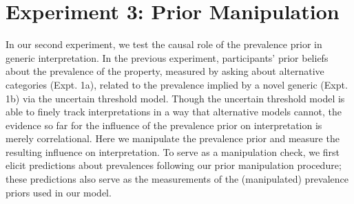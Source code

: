 \documentclass[floatsintext,doc]{apa6}
\begin{document}






\hypertarget{experiment-3-prior-manipulation}{%
\section{Experiment 3: Prior Manipulation}\label{experiment-3-prior-manipulation}}

In our second experiment, we test the causal role of the prevalence prior in generic interpretation.
In the previous experiment, participants' prior beliefs about the prevalence of the property, measured by asking about alternative categories (Expt. 1a), related to the prevalence implied by a novel generic (Expt. 1b) via the uncertain threshold model.
Though the uncertain threshold model is able to finely track interpretations in a way that alternative models cannot, the evidence so far for the influence of the prevalence prior on interpretation is merely correlational.
Here we manipulate the prevalence prior and measure the resulting influence on interpretation.
To serve as a manipulation check, we first elicit predictions about prevalences following our prior manipulation procedure; these predictions also serve as the measurements of the (manipulated) prevalence priors used in our model.
\end{document}
